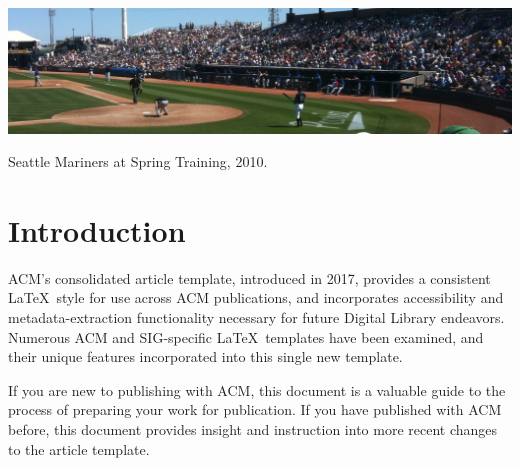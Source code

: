 \documentclass[sigconf, authordraft]{acmart}
\begin{document}
	 
	 


	\begin{teaserfigure}
		\includegraphics[width=\textwidth]{sampleteaser}
		\caption{Seattle Mariners at Spring Training, 2010.}
		\label{fig:teaser}
	\end{teaserfigure}

	  

	\maketitle


	\section{Introduction}
	ACM's consolidated article template, introduced in 2017, provides a consistent
	\LaTeX\ style for use across ACM publications, and incorporates accessibility and
	metadata-extraction functionality necessary for future Digital Library endeavors.
	Numerous ACM and SIG-specific \LaTeX\ templates have been examined, and their unique
	features incorporated into this single new template.

	If you are new to publishing with ACM, this document is a valuable guide to
	the process of preparing your work for publication. If you have published with
	ACM before, this document provides insight and instruction into more recent
	changes to the article template.
\end{document}
